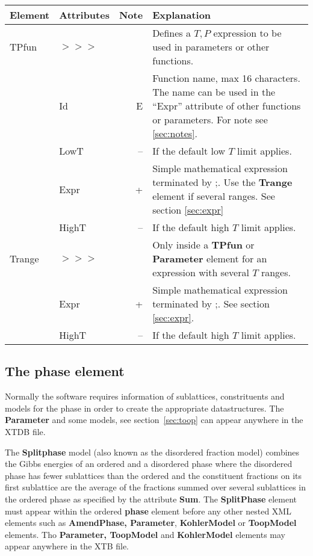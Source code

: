 \documentclass{article}
\begin{document}
\bigskip
\begin{tabular}{|p{} p{} r p{}|}\hline
  Element & Attributes & Note & Explanation\\\hline

  TPfun &$>>>$&& Defines a $T, P$ expression to be used in parameters or other functions.\\
        & Id & E & Function name, max 16 characters. The name can be used in the ``Expr'' attribute of other functions or parameters.  For note see \ref{sec:notes}.\\
        & LowT & -- & If the default low $T$ limit applies.\\
        & Expr & + & Simple mathematical expression terminated by ;.   Use the {\bf Trange} element if several ranges.  See section \ref{sec:expr}\\
        & HighT & -- & If the default high $T$ limit applies.\\\hline

  Trange &$>>>$&& Only inside a {\bf TPfun} or {\bf Parameter} element for an expression with several $T$ ranges.\\ 
         & Expr & + & Simple mathematical expression terminated by ;.  See section \ref{sec:expr}.\\
         & HighT & -- & If the default high $T$ limit applies.\\\hline
\end{tabular}

\subsection{The phase element}\label{sec:phase}

Normally the software requires information of sublattices,
constrituents and models for the phase in order to create the
appropriate datastructures.  The {\bf Parameter} and some models, see
section~\ref{sec:toop} can appear anywhere in the XTDB file.

The {\bf Splitphase} model (also known as the disordered fraction
model) combines the Gibbs energies of an ordered and a disordered
phase where the disordered phase has fewer sublattices than the
ordered and the constituent fractions on its first sublattice are the
average of the fractions summed over several sublattices in the
ordered phase as specified by the attribute {\bf Sum}.  The {\bf
  SplitPhase} element must appear within the ordered {\bf phase}
element before any other nested XML elements such as {\bf AmendPhase,
  Parameter}, {\bf KohlerModel} or {\bf ToopModel} elements.  Tho {\bf
  Parameter, ToopModel} and {\bf KohlerModel} elements may appear anywhere in
the XTB file.
\end{document}

